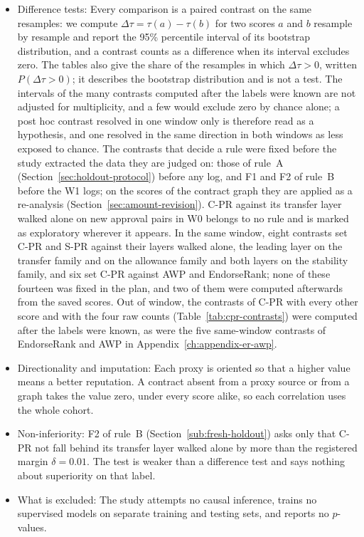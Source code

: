 \begin{itemize}
\item Difference tests: Every comparison is a paired contrast on the same resamples: we compute $\Delta\tau=\tau(a)-\tau(b)$ for two scores $a$ and $b$ resample by resample and report the 95\% percentile interval of its bootstrap distribution, and a contrast counts as a difference when its interval excludes zero. The tables also give the share of the resamples in which $\Delta\tau>0$, written $P(\Delta\tau>0)$; it describes the bootstrap distribution and is not a test. The intervals of the many contrasts computed after the labels were known are not adjusted for multiplicity, and a few would exclude zero by chance alone; a post hoc contrast resolved in one window only is therefore read as a hypothesis, and one resolved in the same direction in both windows as less exposed to chance. The contrasts that decide a rule were fixed before the study extracted the data they are judged on: those of rule~A (Section~\ref{sec:holdout-protocol}) before any log, and F1 and F2 of rule~B before the W1 logs; on the scores of the contract graph they are applied as a re-analysis (Section~\ref{sec:amount-revision}). \mbox{C-PR} against its transfer layer walked alone on new approval pairs in W0 belongs to no rule and is marked as exploratory wherever it appears. In the same window, eight contrasts set \mbox{C-PR} and \mbox{S-PR} against their layers walked alone, the leading layer on the transfer family and on the allowance family and both layers on the stability family, and six set \mbox{C-PR} against AWP and EndorseRank; none of these fourteen was fixed in the plan, and two of them were computed afterwards from the saved scores. Out of window, the contrasts of \mbox{C-PR} with every other score and with the four raw counts (Table~\ref{tab:cpr-contrasts}) were computed after the labels were known, as were the five same-window contrasts of EndorseRank and AWP in Appendix~\ref{ch:appendix-er-awp}.

\item Directionality and imputation: Each proxy is oriented so that a higher value means a better reputation. A contract absent from a proxy source or from a graph takes the value zero, under every score alike, so each correlation uses the whole cohort.

\item Non-inferiority: F2 of rule~B (Section~\ref{sub:fresh-holdout}) asks only that \mbox{C-PR} not fall behind its transfer layer walked alone by more than the registered margin $\delta=0.01$. The test is weaker than a difference test and says nothing about superiority on that label.

\item What is excluded: The study attempts no causal inference, trains no supervised models on separate training and testing sets, and reports no $p$-values.

\end{itemize}

